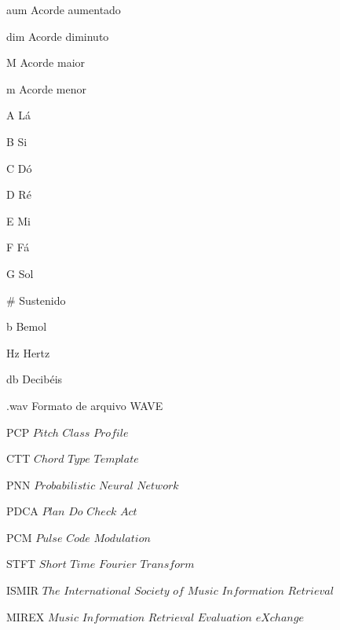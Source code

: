 \begin{siglas}
  \item[aum] Acorde aumentado
  \item[dim] Acorde diminuto
  \item[M] Acorde maior
  \item[m] Acorde menor
  \item[A] Lá
  \item[B] Si
  \item[C] Dó
  \item[D] Ré
  \item[E] Mi
  \item[F] Fá
  \item[G] Sol
  \item[\#] Sustenido
  \item[b] Bemol
  \item[Hz] Hertz
  \item[db] Decibéis
  \item[.wav] Formato de arquivo WAVE
  \item[PCP] $Pitch$ $Class$ $Profile$
  \item[CTT] $Chord$ $Type$ $Template$
  \item[PNN] $Probabilistic$ $Neural$ $Network$
  \item[PDCA] $Plan$ $Do$ $Check$ $Act$
  \item[PCM] $Pulse$ $Code$ $Modulation$
  \item[STFT] $Short$ $Time$ $Fourier$ $Transform$
  \item[ISMIR] $The$ $International$ $Society$ $of$ $Music$ $Information$ $Retrieval$
  \item[MIREX] $Music$ $Information$ $Retrieval$ $Evaluation$ $eXchange$

\end{siglas}
